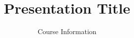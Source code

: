 \makeatletter
\providecommand{\eth@titlepicturefile}{}
\renewcommand{\eth@titlepicturefile}{title.pdf}
\makeatother

\title{Presentation Title}
\subtitle{Course Information} %

\def\titlecomment{\vspace{0.5em}}
\def\authorcomment{FS2019} %
